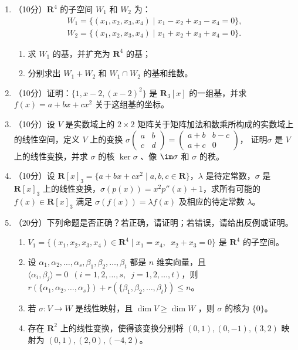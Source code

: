 \begin{enumerate}
    \item （10分）\(\mathbf{R}^4\) 的子空间 \(W_1\) 和 \(W_2\) 为：
    \begin{align*}
        W_1 = \{ (x_1,x_2,x_3,x_4) \mid x_1 - x_2 + x_3 - x_4 = 0 \}, \\
        W_2 = \{ (x_1,x_2,x_3,x_4) \mid x_1 + x_2 + x_3 + x_4 = 0 \}.
    \end{align*}
    \begin{enumerate}
        \item 求 \(W_1\) 的基，并扩充为 \(\mathbf{R}^4\) 的基；
        \item 分别求出 \(W_1+W_2\) 和 \(W_1\cap W_2\) 的基和维数。
    \end{enumerate}

    \item （10分）证明：\(\{1,x-2,(x-2)^2\}\) 是 \(\mathbf{R}_3[x]\) 的一组基，并求 \(f(x)=a+bx+cx^2\) 关于这组基的坐标。

    \item （10分）设 \(V\) 是实数域上的 \(2\times2\) 矩阵关于矩阵加法和数乘所构成的实数域上的线性空间，定义 \(V\) 上的变换
    \(\sigma\left(\begin{matrix}
        a & b \\
        c & d
    \end{matrix}\right)= \begin{pmatrix}
        a + b & b - c \\
        a + c & 0
    \end{pmatrix}
    \)，
    证明\(\sigma\) 是 \(V\) 上的线性变换，并求 \(\sigma\) 的核 \(\ker \sigma\) 、像 \(\im \sigma\) 和 \(\sigma\) 的秩。

    \item （10分）设 $\mathbf{R}[x]_3 = \{a + bx + cx^2 \mid a, b, c \in \mathbf{R}\}$，$\lambda$ 是待定常数，$\sigma$ 是 $\mathbf{R}[x]_3$ 上的线性变换，$\sigma(p(x)) = x^2 p''(x) + 1$，求所有可能的 $f(x) \in \mathbf{R}[x]_3$ 满足 $\sigma(f(x)) = \lambda f(x)$ 及相应的待定常数 $\lambda$。

    \item （20分）下列命题是否正确？若正确，请证明；若错误，请给出反例或证明。
    \begin{enumerate}
        \item \(V_1 = \{(x_1,x_2,x_3,x_4)\in \mathbf{R}^4 \mid x_1 = x_4,\enspace x_2 + x_3 = 0\}\) 是 \(\mathbf{R}^4\) 的子空间。
        \item 设 \(\alpha_1,\alpha_2,\ldots,\alpha_s,\beta_1,\beta_2,\ldots,\beta_t\) 都是 \(n\) 维实向量，且 \(\langle \alpha_i,\beta_j \rangle=0\enspace\allowbreak (i=1,2,\ldots,s,\enspace\allowbreak j=1,2,\ldots,t)\)，则 \(r(\{\alpha_1,\alpha_2,\ldots,\alpha_s\})+r(\{\beta_1,\beta_2,\ldots,\beta_t\}) \leqslant n\)。
        \item 若 \(\sigma\colon V\rightarrow W\) 是线性映射，且 \(\dim V \geqslant \dim W\) ，则 \(\sigma\) 的核为 \(\{0\}\)。
        \item 存在 \(\mathbf{R}^2\) 上的线性变换，使得该变换分别将 \((0,1),(0,-1),(3,2)\) 映射为 \((0,1),\allowbreak(2,0),\allowbreak(-4,2)\)。
    \end{enumerate}
\end{enumerate}

\clearpage
